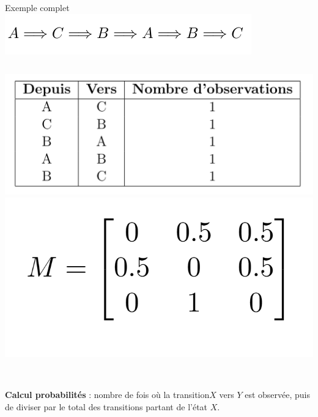 \begin{frame}{Exemple complet}
\vspace{-1cm}
\centering
        \includegraphics[width=0.8\textwidth]{images/transition_ex_markov.png} \\
        \vspace{1cm}
    \begin{columns}
    		\includegraphics[width=\textwidth]{images/tableau_ex_markov.png} \\
                \includegraphics[width=\textwidth]{images/matrice_markov.png} \\
    \end{columns} \\
    \vspace{1cm}
    \textbf{Calcul probabilités} :  nombre de fois où la transition\(X\) vers \(Y\) est observée, puis de diviser par le total des transitions partant de l'état \(X\).
\end{frame}